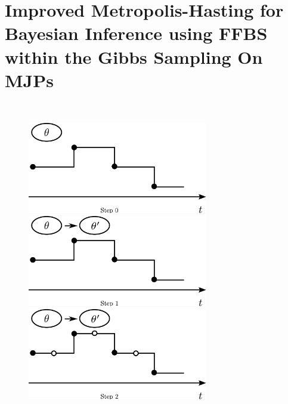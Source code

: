 
\section{Improved Metropolis-Hasting for Bayesian Inference using FFBS  within the Gibbs Sampling On MJPs}~
\setlength{\unitlength}{0.8cm}
  \begin{figure}[H]
  \centering
  \begin{minipage}[!hp]{0.45\linewidth}
  \centering
    \includegraphics [width=0.70\textwidth, angle=0]{figs/plot0.pdf}
      \end{minipage}
  \begin{minipage}[hp]{0.45\linewidth}
  \centering
    \includegraphics [width=0.70\textwidth, angle=0]{figs/plot1.pdf}
    \vspace{-0 in}
  \end{minipage}
  \begin{minipage}[hp]{0.45\linewidth}
  \centering
    \includegraphics [width=0.70\textwidth, angle=0]{figs/plot2.pdf}
    \vspace{-0 in}
  \end{minipage}

\end{figure}

